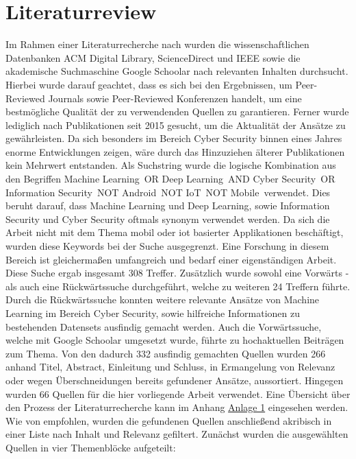 \documentclass[
    12pt, %
    DIV10,
    ngerman, %
    a4paper, %
    oneside, %
    titlepage, %
    parskip=half, %
    headings=normal, %
    listof=totoc, %
    bibliography=totoc, %
    index=totoc, %
    captions=tableheading, %
    final %
]{scrreprt}
\begin{document}
\section{Literaturreview}
\label{sec:lr}
Im Rahmen einer Literaturrecherche nach \textcite{Webster2002} wurden die wissenschaftlichen Datenbanken ACM Digital Library, ScienceDirect und IEEE sowie die akademische Suchmaschine Google Schoolar nach relevanten Inhalten durchsucht. Hierbei wurde darauf geachtet, dass es sich bei den Ergebnissen, um Peer-Reviewed Journals sowie Peer-Reviewed Konferenzen handelt, um eine bestmögliche Qualität der zu verwendenden Quellen zu garantieren. Ferner wurde lediglich nach Publikationen seit 2015 gesucht, um die Aktualität der Ansätze zu gewährleisten. Da sich besonders im Bereich Cyber Security binnen eines Jahres enorme Entwicklungen zeigen, wäre durch das Hinzuziehen älterer Publikationen kein Mehrwert entstanden. Als Suchstring wurde die logische Kombination aus den Begriffen \glqq Machine Learning\grqq\ OR \glqq Deep Learning\grqq\ AND \glqq Cyber Security\grqq\ OR \glqq Information Security\grqq\ NOT \glqq Android\grqq\ NOT \glqq IoT\grqq\ NOT \glqq Mobile\grqq\ verwendet. Dies beruht darauf, dass Machine Learning und Deep Learning, sowie Information Security und Cyber Security oftmals synonym verwendet werden. Da sich die Arbeit nicht mit dem Thema mobil oder \ac{iot} basierter Applikationen beschäftigt, wurden diese Keywords bei der Suche ausgegrenzt. Eine Forschung in diesem Bereich ist gleichermaßen umfangreich und bedarf einer eigenständigen Arbeit. Diese Suche ergab insgesamt 308 Treffer. Zusätzlich wurde sowohl eine Vorwärts - als auch eine Rückwärtssuche durchgeführt, welche zu weiteren 24 Treffern führte. Durch die Rückwärtssuche konnten weitere relevante Ansätze von Machine Learning im Bereich Cyber Security, sowie hilfreiche Informationen zu bestehenden Datensets ausfindig gemacht werden. Auch die Vorwärtssuche, welche mit Google Schoolar umgesetzt wurde, führte zu hochaktuellen Beiträgen zum Thema. Von den dadurch 332 ausfindig gemachten Quellen wurden 266 anhand Titel, Abstract, Einleitung und Schluss, in Ermangelung von Relevanz oder wegen Überschneidungen bereits gefundener Ansätze, aussortiert. Hingegen wurden 66 Quellen für die hier vorliegende Arbeit verwendet. Eine Übersicht über den Prozess der Literaturrecherche kann im Anhang \hyperref[rm]{Anlage 1} eingesehen werden. Wie von \textcite{Webster2002} empfohlen, wurden die gefundenen Quellen anschließend akribisch in einer Liste nach Inhalt und Relevanz gefiltert. Zunächst wurden die ausgewählten Quellen in vier Themenblöcke aufgeteilt:
\end{document}
